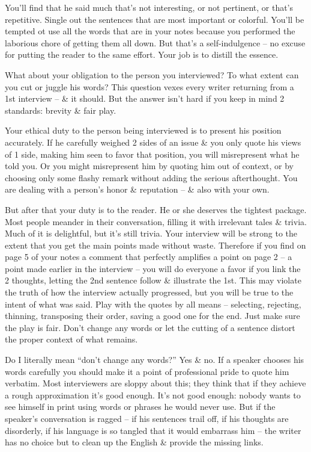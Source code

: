 \documentclass{article}
\begin{document}
You'll find that he said much that's not interesting, or not pertinent, or that's repetitive. Single out the sentences that are most important or colorful. You'll be tempted ot use all the words that are in your notes because you performed the laborious chore of getting them all down. But that's a self-indulgence -- no excuse for putting the reader to the same effort. Your job is to distill the essence.

What about your obligation to the person you interviewed? To what extent can you cut or juggle his words? This question vexes every writer returning from a 1st interview -- \& it should. But the answer isn't hard if you keep in mind 2 standards: brevity \& fair play.

Your ethical duty to the person being interviewed is to present his position accurately. If he carefully weighed 2 sides of an issue \& you only quote his views of 1 side, making him seen to favor that position, you will misrepresent what he told you. Or you might misrepresent him by quoting him out of context, or by choosing only some flashy remark without adding the serious afterthought. You are dealing with a person's honor \& reputation -- \& also with your own.

But after that your duty is to the reader. He or she deserves the tightest package. Most people meander in their conversation, filling it with irrelevant tales \& trivia. Much of it is delightful, but it's still trivia. Your interview will be strong to the extent that you get the main points made without waste. Therefore if you find on page 5 of your notes a comment that perfectly amplifies a point on page 2 -- a point made earlier in the interview -- you will do everyone a favor if you link the 2 thoughts, letting the 2nd sentence follow \& illustrate the 1st. This may violate the truth of how the interview actually progressed, but you will be true to the intent of what was said. Play with the quotes by all means -- selecting, rejecting, thinning, transposing their order, saving a good one for the end. Just make sure the play is fair. Don't change any words or let the cutting of a sentence distort the proper context of what remains.

Do I literally mean ``don't change any words?'' Yes \& no. If a speaker chooses his words carefully you should make it a point of professional pride to quote him verbatim. Most interviewers are sloppy about this; they think that if they achieve a rough approximation it's good enough. It's not good enough: nobody wants to see himself in print using words or phrases he would never use. But if the speaker's conversation is ragged -- if his sentences trail off, if his thoughts are disorderly, if his language is so tangled that it would embarrass him -- the writer has no choice but to clean up the English \& provide the missing links.
\end{document}
